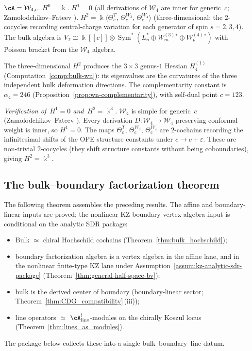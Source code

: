 \begin{computation}
\label{comp:bulk-w4}
$\cA=\mathcal W_{4,c}$. $H^0=\Bbbk$.
$H^1=0$ (all derivations of $\mathcal W_4$ are inner
for generic~$c$; Zamolodchikov--Fateev \cite{FL88}).
$H^2=\Bbbk\langle\Theta_c^T,\,\Theta_c^{W_3},\,
\Theta_c^{W_4}\rangle$ (three-dimensional: the $2$-cocycles
recording central-charge variation for each generator
of spin $s=2,3,4$).
The bulk algebra is
$V_T\cong\Bbbk[[c]]\otimes
\operatorname{Sym}^*\!(L_n^*\oplus W^{(3)}_m{}^*
\oplus W^{(4)}_p{}^*)$
with Poisson bracket from the $\mathcal W_4$ algebra.

The three-dimensional $H^2$ produces the $3\times 3$
genus-$1$ Hessian $H^{(1)}_4$
(Computation~\ref{comp:bulk-wn}): its eigenvalues are
the curvatures of the three independent bulk deformation
directions. The complementarity constant is
$\alpha_4 = 246$ (Proposition~\ref{prop:wn-complementarity}),
with self-dual point $c = 123$.

\emph{Verification of~$H^1=0$ and~$H^2=\Bbbk^3$.}
$\mathcal W_4$ is simple for generic~$c$
(Zamolodchikov--Fateev \cite{FL88}). Every derivation
$D\colon \mathcal W_4 \to \mathcal W_4$ preserving
conformal weight is inner, so $H^1=0$. The maps
$\Theta_c^T$, $\Theta_c^{W_3}$, $\Theta_c^{W_4}$
are $2$-cochains recording
the infinitesimal shifts of the OPE structure constants under
$c \to c + \varepsilon$. These are non-trivial $2$-cocycles
(they shift structure constants without being coboundaries),
giving $H^2 = \Bbbk^3$.
\end{computation}

\subsection{The bulk--boundary factorization theorem}
\label{subsec:bulk-boundary-factorization-theorem}

The following theorem assembles the preceding results. The affine and
boundary-linear inputs are proved; the nonlinear KZ boundary vertex
algebra input is conditional on the analytic SDR package:
\begin{itemize}
\item Bulk $\simeq$ chiral Hochschild cochains
 (Theorem~\ref{thm:bulk_hochschild});
\item boundary factorization algebra is a vertex algebra in the affine
 lane, and in the nonlinear finite-type KZ lane under
 Assumption~\ref{assum:kz-analytic-sdr-package}
 (Theorem~\ref{thm:general-half-space-bv});
\item bulk is the derived center of boundary
 (boundary-linear sector; Theorem~\ref{thm:CDG_compatibility}\,(iii));
\item line operators $\simeq$ $\cA^!_{\mathrm{line}}$-modules
 on the chirally Koszul locus
 (Theorem~\ref{thm:lines_as_modules}).
\end{itemize}
The package below collects these into a single bulk--boundary--line datum.

